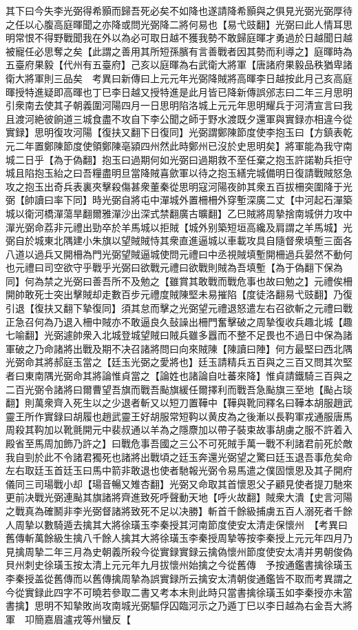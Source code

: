 其下曰今失李光弼得希顥而歸吾死必矣不如降也遂請降希顥與之俱見光弼光弼厚待之任以心腹高庭暉聞之亦降或問光弼降二將何易也【易弋豉翻】光弼曰此人情耳思明常恨不得野戰聞我在外以為必可取日越不獲我勢不敢歸庭暉才勇過於日越聞日越被寵任必思奪之矣【此謂之善用其所短孫臏有言善戰者因其勢而利導之】庭暉時為五臺府果毅【代州有五臺府】己亥以庭暉為右武衛大將軍【唐諸府果毅品秩猶卑諸衛大將軍則三品矣　考異曰新傳曰上元元年光弼降賊將高暉李日越按此月己亥高庭暉授特進疑即高暉也丁巳李日越又授特進是此月皆已降新傳誤邠志曰二年三月思明引衆南去使其子朝義圍河陽四月一日思明陷洛城上元元年思明耀兵于河清宣言曰我且渡河絶彼餉道三城食盡不攻自下李公聞之師于野水渡既夕還軍與實録亦相違今從實録】思明復攻河陽【復扶又翻下日復同】光弼謂鄭陳節度使李抱玉曰【方鎮表乾元二年置鄭陳節度使領鄭陳亳潁四州然此時鄭州已沒於史思明矣】將軍能為我守南城二日乎【為于偽翻】抱玉曰過期何如光弼曰過期救不至任棄之抱玉許諾勒兵拒守城且陷抱玉紿之曰吾糧盡明旦當降賊喜歛軍以待之抱玉繕完城備明日復請戰賊怒急攻之抱玉出奇兵表裏夾擊殺傷甚衆董秦從思明寇河陽夜帥其衆五百拔柵突圍降于光弼【帥讀曰率下同】時光弼自將屯中潬城外置柵柵外穿塹深廣二丈【中河起石潬築城以衛河橋潬蕩旱翻爾雅潬沙出深式禁翻廣古曠翻】乙巳賊將周摯捨南城併力攻中潬光弼命荔非元禮出勁卒於羊馬城以拒賊【城外别築短垣高纔及肩謂之羊馬城】光弼自於城東北隅建小朱旗以望賊賊恃其衆直進逼城以車載攻具自隨督衆填塹三面各八道以過兵又開柵為門光弼望賊逼城使問元禮曰中丞視賊填塹開柵過兵晏然不動何也元禮曰司空欲守乎戰乎光弼曰欲戰元禮曰欲戰則賊為吾填塹【為于偽翻下保為同】何為禁之光弼曰善吾所不及勉之【雖賞其敢戰而戰危事也故曰勉之】元禮俟柵開帥敢死士突出擊賊却走數百步元禮度賊陳堅未易摧陷【度徒洛翻易弋豉翻】乃復引退【復扶又翻下摯復同】須其怠而擊之光弼望元禮退怒遣左右召欲斬之元禮曰戰正急召何為乃退入柵中賊亦不敢逼良久鼔譟出柵門奮擊破之周摯復收兵趣北城【趣七喻翻】光弼遽帥衆入北城登城望賊曰賊兵雖多囂而不整不足畏也不過日中保為諸軍破之乃命諸將出戰及期不决召諸將問曰向來賊陳【陳讀曰陣】何方最堅曰西北隅光弼命其將郝庭玉當之【廷玉光弼之愛將也】廷玉請精兵五百與之三百又問其次堅者曰東南隅光弼命其將論惟貞當之【論姓也諸論自吐蕃來降】惟貞請鐵騎三百與之二百光弼令諸將曰爾曹望吾旗而戰吾颭旗緩任爾擇利而戰吾急颭旗三至地【颭占琰翻】則萬衆齊入死生以之少退者斬又以短刀置鞾中【鞾與靴同釋名曰鞾本胡服趙武靈王所作實録曰胡履也趙武靈王好胡服常短䩓以黄皮為之後漸以長䩓軍戎通服唐馬周殺其䩓加以靴氈開元中裴叔通以羊為之隱麖加以帶子裝束故事胡虜之服不許着入殿省至馬周加飾乃許之】曰戰危事吾國之三公不可死賊手萬一戰不利諸君前死於敵我自剄於此不令諸君獨死也諸將出戰頃之廷玉奔還光弼望之驚曰廷玉退吾事危矣命左右取廷玉首廷玉曰馬中箭非敢退也使者馳報光弼令易馬遣之僕固懷恩及其子開府儀同三司瑒戰小却【瑒音暢又雉杏翻】光弼又命取其首懷恩父子顧見使者提刀馳來更前决戰光弼連颭其旗諸將齊進致死呼聲動天地【呼火故翻】賊衆大潰【史言河陽之戰真為確鬭非李光弼督諸將致死不足以决勝】斬首千餘級捕虜五百人溺死者千餘人周摯以數騎遁去擒其大將徐璜玉李秦授其河南節度使安太清走保懷州　【考異曰舊傳斬萬餘級生擒八千餘人擒其大將徐璜玉李秦授周摯等按李秦授上元元年四月乃見擒周摯二年三月為史朝義所殺今從實録實録云擒偽懷州節度使安太凊并男朝俊偽貝州刺史徐璜玉按太清上元元年九月拔懷州始擒之今從舊傳　予按通鑑書擒徐璜玉李秦授盖從舊傳而以舊傳擒周摯為誤實録所云擒安太清朝俊通鑑皆不取而考異謂之今從實録此四字不可曉若參取二書又考本末則此時只當書擒徐璜玉如李秦授亦未當書擒】思明不知摯敗尚攻南城光弼驅俘囚臨河示之乃遁丁巳以李日越為右金吾大將軍　卭簡嘉眉瀘戎等州蠻反【